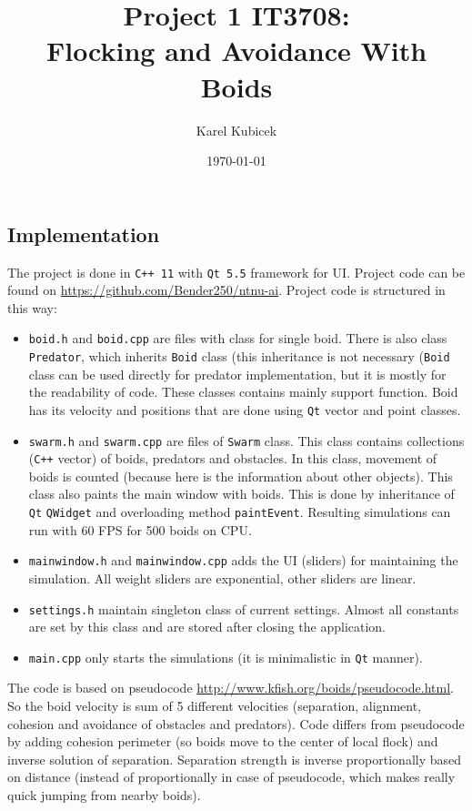 \documentclass[a4paper,12pt]{article}
\title{Project 1 IT3708:\\ Flocking and Avoidance With Boids}
\author{Karel Kubicek}
\date{\today}
\newcommand{\qt}[0]{\texttt{Qt}}
\newcommand{\cpp}[0]{\texttt{C++}}
\begin{document}
    \vspace*{-130pt}
    {\let\newpage\relax\maketitle}

\subsection*{Implementation}

The project is done in \texttt{C++ 11} with \texttt{Qt 5.5} framework for UI. Project code can be found on \url{https://github.com/Bender250/ntnu-ai}. Project code is structured in this way:
\begin{itemize}
\itemsep-0.5em
    \item \texttt{boid.h} and \texttt{boid.cpp} are files with class for single boid. There is also class \texttt{Predator}, which inherits \texttt{Boid} class (this inheritance is not necessary (\texttt{Boid} class can be used directly for predator implementation, but it is mostly for the readability of code. These classes contains mainly support function. Boid has its velocity and positions that are done using \qt{} vector and point classes.
    \item \texttt{swarm.h} and \texttt{swarm.cpp} are files of \texttt{Swarm} class. This class contains collections (\cpp{} vector) of boids, predators and obstacles. In this class, movement of boids is counted (because here is the information about other objects). This class also paints the main window with boids. This is done by inheritance of \qt{} \texttt{QWidget} and overloading method \texttt{paintEvent}. Resulting simulations can run with 60 FPS for 500 boids on CPU.
    \item \texttt{mainwindow.h} and \texttt{mainwindow.cpp} adds the UI (sliders) for maintaining the simulation. All weight sliders are exponential, other sliders are linear.
    \item \texttt{settings.h} maintain singleton class of current settings. Almost all constants are set by this class and are stored after closing the application.
    \item \texttt{main.cpp} only starts the simulations (it is minimalistic in \qt{} manner).
\end{itemize}

The code is based on pseudocode \url{http://www.kfish.org/boids/pseudocode.html}. So the boid velocity is sum of 5 different velocities (separation, alignment, cohesion and avoidance of obstacles and predators). Code differs from pseudocode by adding cohesion perimeter (so boids move to the center of local flock) and inverse solution of separation. Separation strength is inverse proportionally based on distance (instead of proportionally in case of pseudocode, which makes really quick jumping from nearby boids).
\end{document}
